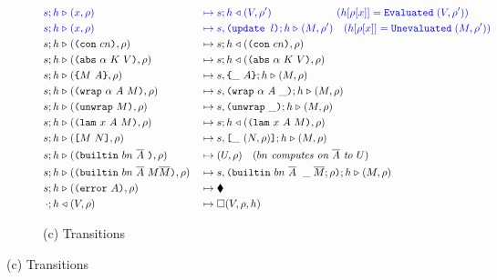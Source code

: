 \begin{figure}
\hspace{-25mm}\begin{subfigure}[c]{\linewidth}   %
{
\small
\caption*{\hspace{50mm}(c) Transitions}
\begin{alignat*}{2}\\
      \blue{s;h} &\bcompute \blue{(x, \rho)}        &{}\bmapsto{}& \blue{s;h \return (V,\rho^{\prime})  \hspace{62pt} (h[\rho[x]] = \texttt{Evaluated}\; (V, \rho^{\prime}))}\\  %
      \blue{s;h} &\bcompute \blue{(x, \rho)}        &{}\bmapsto{}& \blue{s,\texttt{(update\ $l$)}; h \compute (M,\rho^{\prime}) \quad (h[\rho[x]] = \texttt{Unevaluated}\; (M,\rho^{\prime}))}\\  %
      s;h &\compute (\con{cn}, \rho)               &{}\mapsto{}& s;h \return (\con{cn}, \rho)\\
      s;h &\compute (\abs{\alpha}{K}{V}, \rho)      &{}\mapsto{}& s;h \return (\abs{\alpha}{K}{V}, \rho)\\
      s;h &\compute (\inst{M}{A}, \rho)             &{}\mapsto{}& s,\inInstLeftFrame{A}; h \compute (M,\rho)\\
      s;h &\compute (\wrap{\alpha}{A}{M}, \rho)     &{}\mapsto{}& s,\inWrapRightFrame{\alpha}{A};h \compute (M, \rho)\\
      s;h &\compute (\unwrap{M}, \rho)              &{}\mapsto{}& s, \inUnwrapFrame{};h \compute (M,\rho)\\
      s;h &\compute (\lam{x}{A}{M}, \rho)           &{}\mapsto{}& s;h \return (\lam{x}{A}{M}, \rho)\\
      s;h &\compute (\app{M}{N}, \rho)              &{}\mapsto{}& s,\inAppLeftFrame{(N, \rho)};h \compute (M,\rho)\\
      s;h &\compute (\builtin{bn}{\repetition{A}}{}, \rho) 
                                                    &{}\mapsto{}& (U,\rho) \quad (\textit{$bn$ computes on $\repetition{A}$ to $U$})\\
      s;h &\compute (\builtin{bn}{\repetition{A}}{M \repetition{M}}, \rho) 
                                                    &{}\mapsto{}& s,\inBuiltin{bn}{\repetition{A}}{}{\_}{\repetition{M}; \rho};h \compute (M, \rho)\\
      s;h &\compute (\error{A}, \rho) &{}\mapsto{}& \ckerror{}\\
      \cdot;h &\return (V, \rho) &{}\mapsto{}& \square(V, \rho, h)\\

\end{alignat*}}
\end{subfigure}
\end{figure}
